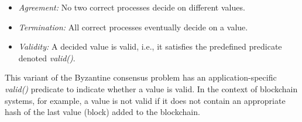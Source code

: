  \begin{itemize} \item \emph{Agreement:} No two correct processes decide on
         different values.  \item \emph{Termination:} All correct processes
         eventually decide on a value.  \item \emph{Validity:} A decided value
             is valid, i.e., it satisfies the predefined predicate denoted
             \emph{valid()}.  \end{itemize}

 This variant of the Byzantine consensus problem has an application-specific
 \emph{valid()} predicate to indicate whether a value is valid. In the context
 of blockchain systems, for example, a value is not valid if it does not
 contain an appropriate hash of the last value (block) added to the blockchain.
